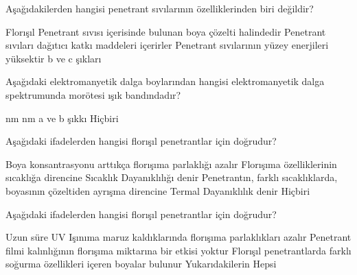 \begin{question}[subtitle=]
Aşağıdakilerden hangisi penetrant sıvılarının özelliklerinden biri değildir?
	\begin{tasks}
          \task Florışıl Penetrant sıvısı içerisinde bulunan boya çözelti halindedir
          \task Penetrant sıvıları dağıtıcı katkı maddeleri içerirler
          \task Penetrant sıvılarının yüzey enerjileri yüksektir \correct
          \task b ve c şıkları
	\end{tasks}
\end{question}
\begin{solution}
	\correct
\end{solution}

\begin{question}[subtitle=]
Aşağıdaki elektromanyetik dalga boylarından hangisi elektromanyetik dalga spektrumunda morötesi ışık bandındadır?
	\begin{tasks}
           nm
           nm
          \task a ve b şıkkı \correct
          \task Hiçbiri
	\end{tasks}
\end{question}
\begin{solution}
	\correct
\end{solution}

\begin{question}[subtitle=]
Aşağıdaki ifadelerden hangisi florışıl penetrantlar için doğrudur?
	\begin{tasks}
          \task Boya konsantrasyonu arttıkça florışıma parlaklığı azalır
          \task Florışıma özelliklerinin sıcaklığa direncine Sıcaklık Dayanıklılığı denir
          \task Penetrantın, farklı sıcaklıklarda, boyasının çözeltiden ayrışma direncine Termal Dayanıklılık denir
          \task Hiçbiri \correct
	\end{tasks}
\end{question}
\begin{solution}
	\correct
\end{solution}

\begin{question}[subtitle=]
Aşağıdaki ifadelerden hangisi florışıl penetrantlar için doğrudur?
	\begin{tasks}
          \task Uzun süre UV Işınıma maruz kaldıklarında florışıma parlaklıkları azalır
          \task Penetrant filmi kalınlığının florışıma miktarına bir etkisi yoktur
          \task Florışıl penetrantlarda farklı soğurma özellikleri içeren boyalar bulunur
          \task Yukarıdakilerin Hepsi \correct
	\end{tasks}
\end{question}
\begin{solution}
	\correct
\end{solution}


